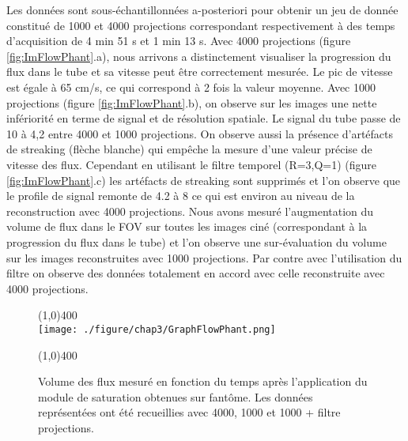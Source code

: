Les données sont sous-échantillonnées a-posteriori pour obtenir un jeu de donnée constitué de 1000 et 4000 projections correspondant respectivement à des temps d'acquisition de 4 min 51 s et 1 min 13 s. Avec 4000 projections (figure \ref{fig:ImFlowPhant}.a), nous arrivons a distinctement visualiser la progression du flux dans le tube et sa vitesse peut être correctement mesurée. Le pic de vitesse est égale à 65 cm/s, ce qui correspond à 2 fois la valeur moyenne. Avec 1000 projections (figure \ref{fig:ImFlowPhant}.b), on observe sur les images une nette infériorité en terme de signal et de résolution spatiale. Le signal du tube passe de 10 à 4,2 entre 4000 et 1000 projections. On observe aussi la présence d'artéfacts de streaking (flèche blanche) qui empêche la mesure d'une valeur précise de vitesse des flux. Cependant en utilisant le filtre temporel (R=3,Q=1) (figure \ref{fig:ImFlowPhant}.c) les artéfacts de streaking sont supprimés et l'on observe que le profile de signal remonte de 4.2 à 8 ce qui est environ au niveau de la reconstruction avec 4000 projections.
Nous avons mesuré l'augmentation du volume de flux dans le FOV sur toutes les images ciné (correspondant à la progression du flux dans le tube) et l'on observe une sur-évaluation du volume sur les images reconstruites avec 1000 projections. Par contre avec l'utilisation du filtre on observe des données totalement en accord avec celle reconstruite avec 4000 projections.
\begin{figure}[H]
\centering \line(1,0){400} \\
\texttt{[image: ./figure/chap3/GraphFlowPhant.png]}
\caption[Graphique de progression du flux sur fantôme]{\label{fig:GraphFlowPhant} Volume des flux mesuré en fonction du temps après l'application du module de saturation obtenues sur fantôme. Les données représentées ont été recueillies avec 4000, 1000 et 1000 + filtre projections.}
\line(1,0){400} \\ \end{figure}

